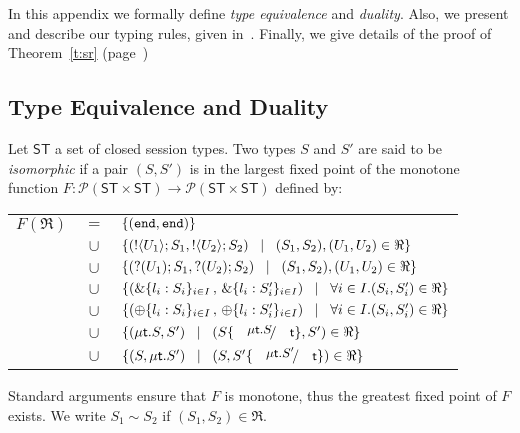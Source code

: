 In this appendix we formally define 
\emph{type equivalence} and 
\emph{duality}. 
Also, we  present and describe our typing rules, given in~.
Finally, we give details of the proof of Theorem~\ref{t:sr} (page~\pageref{t:sr}) 


\subsection{Type Equivalence and Duality}
\begin{definition}
\label{def:iso}
Let $\mathsf{ST}$ a set of closed session types. 
Two types $S$ and $S'$ are said to be {\em isomorphic} if a pair $(S,S')$ is 
in the largest fixed point of the monotone function
$F:\mathcal{P}(\mathsf{ST}\times \mathsf{ST}) \to 
\mathcal{P}(\mathsf{ST}\times \mathsf{ST})$ defined by:

\hspace{-0.5cm}\begin{tabular}{rcl}
$F(\Re)$ &$\!\!=\!\!$&	$\{(\mathtt{end}, \mathtt{end})\}$\\
         &$\!\!\cup\!\!$&	$\{(! \langle U_1 \rangle ; S_1, ! \langle U_2 \rangle ; S_2)
\;\;\;|\;\;\; (S_1, S_2),(U_1, U_2)\in \Re\}$\\ 
       &$\!\!\cup\!\!$&	$\{(? (U_1) ; S_1, ? (U_2) ; S_2)
\;\;\;|\;\;\;(S_1, S_2),(U_1, U_2)\in \Re\}$\\ 
	&$\!\!\cup\!\!$&	$\{(\& \{l_i: S_i\}_{i \in I} \,,\, \& \{l_i: S_i'\}_{i \in I}) \;\;\;|\;\;\; \forall i\in I. (S_i, S_i')\in \Re\}$\\
	&$\!\!\cup\!\!$&	$\{(\oplus \{l_i: S_i\}_{i \in I}\,,\, \oplus \{l_i: S_i'\}_{i \in I}) \;\;\;|\;\;\; \forall i\in I. (S_i, S_i')\in \Re\}$\\
	&$\!\!\cup\!\!$&	$\set{(\trec{t}{S}, S')
\bnfbar (S\subst{\trec{t}{S}}{\vart{t}},S')\in \Re}$\\
	&$\!\!\cup\!\!$&	$\set{(S,\trec{t}{S'})
\bnfbar (S,S'\subst{\trec{t}{S'}}{\vart{t}})\in \Re}$
\end{tabular}
	
\noindent
Standard arguments ensure that $F$ is monotone, thus the greatest fixed point
of $F$ exists. We write $S_1 \sim S_2$ if  $(S_1,S_2)\in \Re$. 
\end{definition}

\smallskip 

